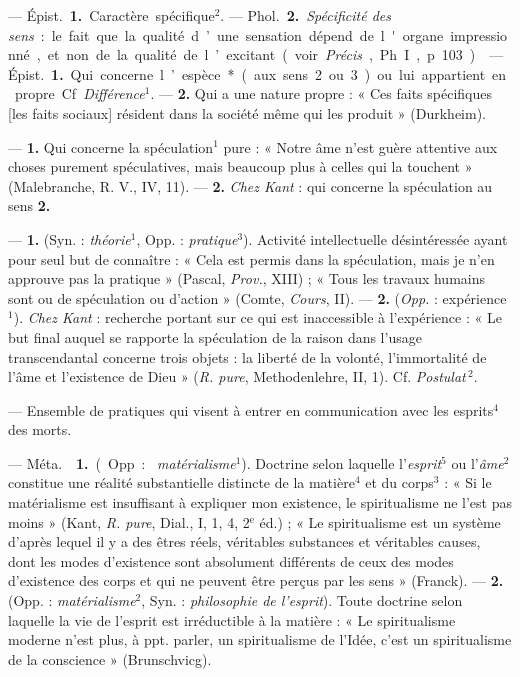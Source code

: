 \begin{itemize}[leftmargin=1cm, label=, itemsep=1pt]
 — \si{Épist.} {\bf 1.} Caractère spécifique$^2$. — \si{Phol.}
{\bf 2.} {\it Spécificité des sens} : le fait que la qualité d’une sensation
dépend de l'organe impressionné, et non de la qualité de l’excitant (voir
{\it Précis}, Ph. I, p. 103).

 — \si{Épist.} {\bf 1.} Qui concerne l’espèce* (aux sens 2 ou
3) ou lui appartient en propre. Cf. {\it Différence}$^1$. — {\bf 2.} Qui a
une nature propre : « Ces faits spécifiques [les faits sociaux] résident dans
la société même qui les produit » (Durkheim).

 — {\bf 1.} Qui concerne la spéculation$^1$ pure : « Notre âme
n'est guère attentive aux choses purement spéculatives, mais beaucoup plus à
celles qui la touchent » (Malebranche, R. V., IV, 11). — {\bf 2.} {\it Chez
Kant} : qui concerne la spéculation au sens {\bf 2.}

 — {\bf 1.} (Syn. : {\it théorie}$^1$, Opp. :
{\it pratique}$^3$). Activité intellectuelle désintéressée ayant pour seul
but de connaître : « Cela est permis dans la spéculation, mais je n’en
approuve pas la pratique » (Pascal, {\it Prov.}, XIII) ; « Tous les travaux
humains sont ou de spéculation ou d'action » (Comte, {\it Cours}, II). —
{\bf 2.} ({\it Opp.} : expérience$^1$). {\it Chez Kant} : recherche portant
sur ce qui est inaccessible à l'expérience : « Le but final auquel se
rapporte la spéculation de la raison dans l’usage transcendantal concerne
trois objets : la liberté de la volonté, l’immortalité de l'âme et
l'existence de Dieu » ({\it R. pure}, Methodenlehre, II, 1). Cf.
{\it Postulat}$\,^2$.

 — Ensemble de pratiques qui visent à entrer en communication
avec les esprits$^4$ des morts.

 — \si{Méta.}  {\bf 1.} (Opp. : {\it
matérialisme}$^1$). Doctrine selon laquelle l'{\it esprit}$^5$ ou
l'{\it âme}$^2$ constitue une réalité substantielle distincte de la
matière$^4$ et du corps$^3$ : « Si le matérialisme est insuffisant à
expliquer mon existence, le spiritualisme ne l’est pas moins » (Kant,
{\it R. pure}, Dial., I, 1, 4, 2$^\text{e}$ éd.) ; « Le spiritualisme est un
système d’après lequel il y a des êtres réels, véritables substances et
véritables causes, dont les modes d’existence sont absolument différents de
ceux des modes d'existence des corps et qui ne peuvent être perçus par les
sens » (Franck). — {\bf 2.} (Opp. : {\it matérialisme}$^2$, Syn. : {\it
philosophie de l'esprit}). Toute doctrine selon laquelle la vie de l'esprit
est irréductible à la matière : « Le spiritualisme moderne n’est plus, à ppt.
parler, un spiritualisme de l’Idée, c’est un spiritualisme de la conscience
» (Brunschvicg).


\end{itemize}
